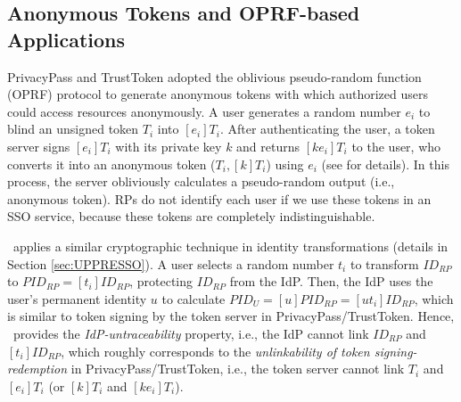 \subsection{Anonymous Tokens and OPRF-based Applications}
\label{sec:related}

PrivacyPass and TrustToken \cite{privacypass,trusttoken} adopted the oblivious pseudo-random function (OPRF) protocol \cite{oprf-proved,voprf-proved} to generate anonymous tokens with which authorized users could access resources anonymously.
A user generates a random number $e_i$ to blind an unsigned token $T_i$ into $[e_i]T_i$. After authenticating the user, a token server signs $[e_i]T_i$ with its private key $k$ and returns $[k e_i]T_i$ to the user, who converts it into an anonymous token  ($T_i, [k]T_i$) using $e_i$ (see \cite{privacypass,trusttoken,oprf-proved} for details). In this process, the server obliviously calculates a pseudo-random output (i.e., anonymous token).
RPs do not identify each user if we use these tokens in an SSO service, because these tokens are completely indistinguishable.

\usso\ applies a similar cryptographic technique in identity transformations  (details in Section \ref{sec:UPPRESSO}).
 A user selects a random number $t_i$ to transform $ID_{RP}$ to $PID_{RP} = [t_i]ID_{RP}$, protecting $ID_{RP}$ from the IdP.
Then, the IdP uses the user's permanent identity $u$ to calculate $PID_U = [u]PID_{RP} = [ut_i]ID_{RP}$,
which is similar to token signing by the token server in PrivacyPass/TrustToken. Hence, \usso\ provides the \emph{IdP-untraceability} property, i.e., the IdP cannot link $ID_{RP}$ and $[t_i]ID_{RP}$, which roughly corresponds to the {\em unlinkability of token signing-redemption} in PrivacyPass/TrustToken, i.e., the token server cannot link $T_i$ and $[e_i]T_i$ (or $[k]T_i$ and $[ke_i]T_i$). %

